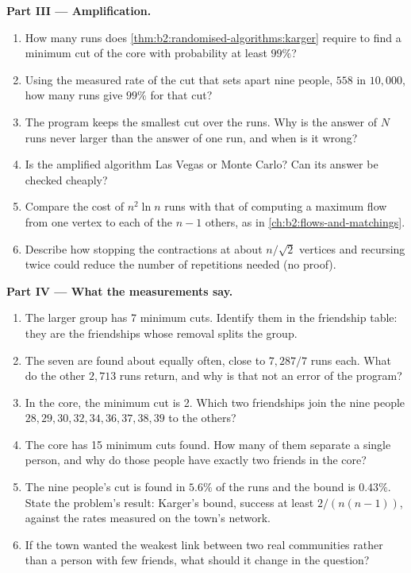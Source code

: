 \begin{problem}
\medskip\noindent\textbf{Part III --- Amplification.}\par\nopagebreak
\begin{enumerate}[resume, beginpenalty=10000]
\item How many runs does \cref{thm:b2:randomised-algorithms:karger} require to find a minimum cut of the core with
probability at least $99\%$?
\item Using the measured rate of the cut that sets apart nine people, $558$ in $10{,}000$, how many runs give $99\%$ for
that cut?
\item The program keeps the smallest cut over the runs. Why is the answer of $N$ runs never larger than the answer of one
run, and when is it wrong?
\item Is the amplified algorithm Las Vegas or Monte Carlo? Can its answer be checked cheaply?
\item Compare the cost of $n^2 \ln n$ runs with that of computing a maximum flow from one vertex to each of the $n - 1$
others, as in \cref{ch:b2:flows-and-matchings}.
\item Describe how stopping the contractions at about $n/\sqrt{2}$ vertices and recursing twice could reduce the number of
repetitions needed (no proof).
\end{enumerate}

\medskip\noindent\textbf{Part IV --- What the measurements say.}\par\nopagebreak
\begin{enumerate}[resume, beginpenalty=10000]
\item The larger group has 7 minimum cuts. Identify them in the friendship table: they are the friendships whose removal
splits the group.
\item The seven are found about equally often, close to $7{,}287/7$ runs each. What do the other $2{,}713$ runs return,
and why is that not an error of the program?
\item In the core, the minimum cut is 2. Which two friendships join the nine people $28, 29, 30, 32, 34, 36, 37, 38, 39$
to the others?
\item The core has 15 minimum cuts found. How many of them separate a single person, and why do those people have exactly
two friends in the core?
\item The nine people's cut is found in $5.6\%$ of the runs and the bound is $0.43\%$. State the problem's result:
Karger's bound, success at least $2/(n(n - 1))$, against the rates measured on the town's network.
\item If the town wanted the weakest link between two real communities rather than a person with few friends, what should
it change in the question?
\end{enumerate}
\end{problem}
